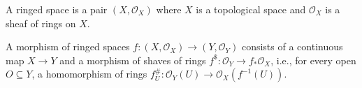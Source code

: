 A ringed space is a pair $(X, \mathcal{O}_X)$ where $X$ is a topological space
and $\mathcal{O}_X$ is a sheaf of rings on $X$.

A morphism of ringed spaces $f\colon (X, \mathcal{O}_X) \to (Y, \mathcal{O}_Y)$
consists of a continuous map $X\to Y$ and a morphism of shaves of rings
$f^\$\colon \mathcal{O}_Y\to f_*\mathcal{O}_X$, i.e., for every open $O \subseteq Y$,
a homomorphism of rings $f^\#_U\colon \mathcal{O}_Y(U)\to \mathcal{O}_X(f^{-1}(U))$.
